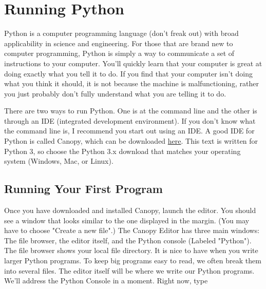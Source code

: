 \chapter{Running Python}
\label{chap:RunningPython}


Python is a computer programming language (don't freak out) with broad
applicability in science and engineering.  For those that are brand
new to computer programming, Python is simply a way to communicate a
set of instructions to your computer.  You'll quickly learn that your
computer is great at doing exactly what you tell it to do.  If you
find that your computer isn't doing what you think it should, it is
not because the machine is malfunctioning, rather you just probably
don't fully understand what you are telling it to do.

There are two ways to run Python. One is at the command line and the
other is through an IDE (integrated development environment). If you
don't know what the command line is, I recommend you start out using
an IDE. A good IDE for Python is called Canopy, which can
be downloaded \href{https://store.enthought.com/downloads/}{here}. This text is written for Python 3, so choose the Python 3.x download that matches your operating system (Windows, Mac, or Linux).


\section{Running Your First Program}

Once you have downloaded and installed Canopy, launch the editor. You should see a window that looks similar to the one displayed in the margin. (You may have to choose "Create a new file".) The Canopy Editor has three main windows: The file browser, the editor itself, and the Python console (Labeled "Python").
The file browser shows your local file directory.  It is nice to have when you write larger Python programs. To keep big programs easy to read, we often break them into several files.
The editor itself will be where we write our Python programs. We'll address the Python Console in a moment. Right now, type

